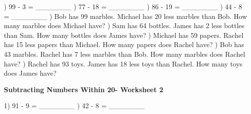 \documentclass{article}%
\begin{document}
\newline%
) 99 {-} 3 = \_\_\_\_\_\_\_%
\newline%
\newline%
) 77 {-} 18 = \_\_\_\_\_\_\_%
\newline%
\newline%
) 86 {-} 19 = \_\_\_\_\_\_\_%
\newline%
\newline%
) 44 {-} 8 = \_\_\_\_\_\_\_%
\newline%
\newline%
) Bob has 99 marbles. Michael has 20 less marbles than Bob. How many marbles does Michael have?%
\newline%
\newline%
) Sam has 64 bottles. James has 2 less bottles than Sam. How many bottles does James have?%
\newline%
\newline%
) Michael has 59 papers. Rachel has 15 less papers than Michael. How many papers does Rachel have?%
\newline%
\newline%
) Bob has 43 marbles. Rachel has 7 less marbles than Bob. How many marbles does Rachel have?%
\newline%
\newline%
) Rachel has 93 toys. James has 18 less toys than Rachel. How many toys does James have?%
\newline%
\newline%
\newline%
\pagebreak%
\large%
\begin{center}%
\textbf{Subtracting Numbers Within 20- Worksheet 2}%
\newline%
\newline%
\newline%
\end{center} \normalsize%
1) 91 {-} 9 = \_\_\_\_\_\_\_%
\newline%
\newline%
) 42 {-} 8 = \_\_\_\_\_\_\_%
\end{document}
